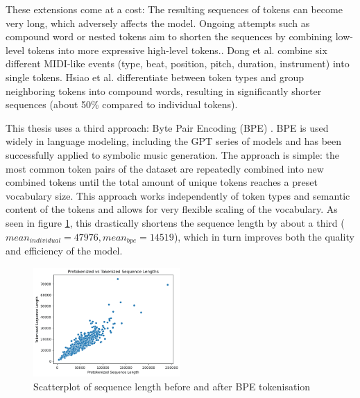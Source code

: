These extensions come at a cost: The resulting sequences of tokens can become very long, which adversely affects the model\cite{Ji_Yang_Luo_survey_symbolic_2024}. Ongoing attempts such as compound word or nested tokens aim to shorten the sequences by combining low-level tokens into more expressive high-level tokens.\cite{Ryu_Dong_nested_2024}. Dong et al.\cite{Dong_Chen_MMT_Kirkpatrick_2023} combine six different MIDI-like events (type, beat, position, pitch, duration, instrument) into single tokens. Hsiao et al.\cite{compound_word_Hsiao_Liu_Yeh_Yang_2021} differentiate between token types and group neighboring tokens into compound words, resulting in significantly shorter sequences (about 50\% compared to individual tokens). 

This thesis uses a third approach: Byte Pair Encoding (BPE) \cite{Sennrich_Haddow_Birch_BPE_2016}. BPE is used widely in language modeling, including the GPT series of models\cite{Radford_Wu_Child_Luan_gpt2_2019} and has been successfully applied to symbolic music generation.\cite{Fradet_Gutowski_Chhel_Briot_2023} The approach is simple: the most common token pairs of the dataset are repeatedly combined into new combined tokens until the total amount of unique tokens reaches a preset vocabulary size. This approach works independently of token types and semantic content of the tokens and allows for very flexible scaling of the vocabulary. As seen in figure \ref{fig:tok_compare}, this drastically shortens the sequence length by about a third ($mean_{individual}=47976, mean_{bpe}=14519$), which in turn improves both the quality and efficiency of the model. 


\begin{figure}[H]
    \centering
    \includegraphics[width=0.5\textwidth]{IMAGES/scatter_pre_post_tok.png} 
    \caption{Scatterplot of sequence length before and after BPE tokenisation}
    \label{fig:tok_compare}
\end{figure}
